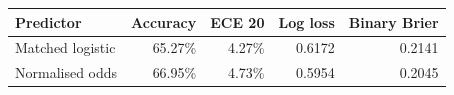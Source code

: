 \begin{tabularx}{\linewidth}{@{}Yrrrr@{}}
\toprule
Predictor & Accuracy & ECE 20 & Log loss & Binary Brier \\

\midrule
Matched logistic & 65.27\% & 4.27\% & 0.6172 & 0.2141 \\
Normalised odds & 66.95\% & 4.73\% & 0.5954 & 0.2045 \\
\bottomrule
\end{tabularx}

